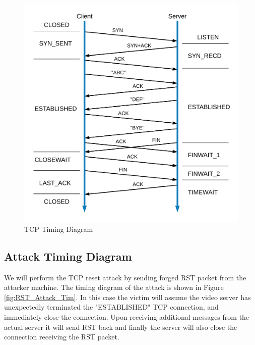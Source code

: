 \documentclass[14pt]{extarticle}
\begin{document}
        \begin{figure}[!h]
        	\centering
        	\includegraphics[width=.95\textwidth]{Pictures/TCP_Timing_Diagram.png}
        	\caption{TCP Timing Diagram}
        	\label{fig:TCP_Tim}
        \end{figure}
        
    \subsection{Attack Timing Diagram}
    
    We will perform the TCP reset attack by sending forged RST packet from the attacker machine. The timing diagram of the attack is shown in Figure \ref{fig:RST_Attack_Tim}. In this case the victim will assume the video server has unexpectedly terminated the "ESTABLISHED" TCP connection, and immediately close the connection. Upon receiving additional messages from the actual server it will send RST back and finally the server will also close the connection receiving the RST packet. \\ 
    
\end{document}
